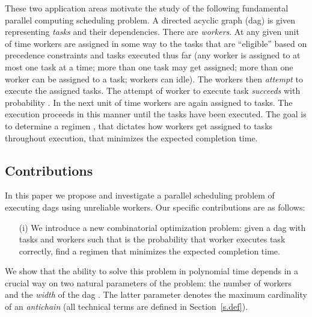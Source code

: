 \documentclass[letterpaper,11pt]{article}
\newcommand{\F}{\vspace*{\smallskipamount}}
\begin{document}
These two application areas motivate the study of the following fundamental parallel computing scheduling problem. A directed acyclic graph (dag) is given representing  {\em tasks} and their dependencies. There are  {\em workers}. At any given unit of time workers are assigned in some way to the tasks that are ``eligible'' based on precedence constraints and tasks executed thus far (any worker is assigned to at most one task at a time; more than one task may get assigned; more than one worker can be assigned to a task; workers can idle). The workers then {\em attempt} to execute the assigned tasks. The attempt of worker  to execute task  {\em succeeds} with probability . In the next unit of time workers are again assigned to tasks. The execution proceeds in this manner until the  tasks have been executed. The goal is to determine a regimen , that dictates how workers get assigned to tasks throughout execution, that minimizes the expected completion time.




\F
\subsection{Contributions}
In this paper we propose and investigate a parallel scheduling problem of executing dags using unreliable workers. Our specific contributions are as follows:
\begin{itemize}
\item[(i)] We introduce a new combinatorial optimization problem: given a dag  with  tasks and  workers such that  is the probability that worker  executes task  correctly, find a regimen  that minimizes the expected completion time.
\end{itemize}

We show that the ability to solve this problem in polynomial time depends in a crucial way on two natural parameters of the problem: the number of workers and the {\em width} of the dag . The latter parameter denotes the maximum cardinality of an {\em antichain} (all technical terms are defined in Section~\ref{s.def}).
\end{document}
